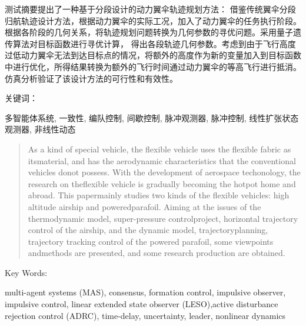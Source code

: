 

\begin{zhaiyao}
测试摘要提出了一种基于分段设计的动力翼伞轨迹规划方法： 借鉴传统翼伞分段归航轨迹设计方法，根据动力翼伞的实际工况，加入了动力翼伞的任务执行阶段。根据各阶段的几何关系，将轨迹规划问题转换为几何参数的寻优问题。采用量子遗传算法对目标函数进行寻优计算， 得出各段轨迹几何参数。考虑到由于飞行高度过低动力翼伞无法到达目标点的情况，将额外的高度作为新的变量加入到目标函数中进行优化，所得结果转换为额外的飞行时间通过动力翼伞的等高飞行进行抵消。仿真分析验证了该设计方法的可行性和有效性。
\end{zhaiyao}

\vskip 4mm
\noindent
{\rmfamily\jiacu 关键词：}
\begin{minipage}[t]{0.88\linewidth}
多智能体系统, 一致性, 编队控制, 间歇控制, 脉冲观测器, 脉冲控制, 线性扩张状态观测器, 非线性动态
\end{minipage}




\begin{abstract}
As a kind of special vehicle, the flexible vehicle uses the flexible fabric as itsmaterial, and has the aerodynamic characteristics that the conventional vehicles donot possess. With the development of aerospace techonology, the research on theflexible vehicle is gradually becoming the hotpot home and abroad. This papermainly studies two kinds of the flexible vehicles: high altitude airship and poweredparafoil. Aiming at the issues of the thermodynamic model, super-pressure controlproject, horizontal trajectory control of the airship, and the dynamic model, trajectoryplanning, trajectory tracking control of the powered parafoil, some viewpoints andmethods are presented, and some research production are obtained.
\end{abstract}

\vskip 4mm
\noindent
{\rmfamily\jiacu Key Words:}
\begin{minipage}[t]{0.88\linewidth}
multi-agent systems (MAS), consensus, formation control, impulsive observer, impulsive control, linear extended state observer (LESO),active disturbance rejection control (ADRC), time-delay, uncertainty,  leader, nonlinear dynamics
\end{minipage}
